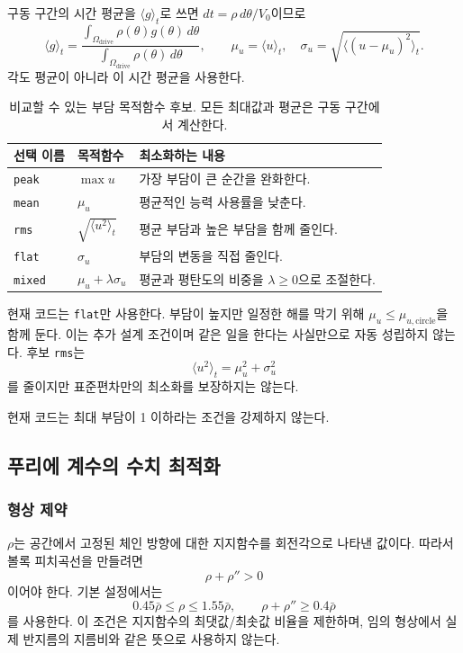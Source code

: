 구동 구간의 시간 평균을 \(\langle g\rangle_t\)로 쓰면 \(dt=\rho\,d\theta/V_0\)이므로
\begin{equation}
\langle g\rangle_t=\frac{\int_{\Omega_{\mathrm{drive}}}\rho(\theta)g(\theta)\,d\theta}
{\int_{\Omega_{\mathrm{drive}}}\rho(\theta)\,d\theta},\qquad
\mu_u=\langle u\rangle_t,\quad \sigma_u=\sqrt{\langle(u-\mu_u)^2\rangle_t}.
\label{eq:me-average}
\end{equation}
각도 평균이 아니라 이 시간 평균을 사용한다.

\begin{table}[!htb]
\centering\small
\begin{tabular}{@{}L{19mm} L{41mm} L{80mm}@{}}
\toprule
선택 이름 & 목적함수 & 최소화하는 내용\\\midrule
\texttt{peak} & \(\max u\) & 가장 부담이 큰 순간을 완화한다.\\
\texttt{mean} & \(\mu_u\) & 평균적인 능력 사용률을 낮춘다.\\
\texttt{rms} & \(\sqrt{\langle u^2\rangle_t}\) & 평균 부담과 높은 부담을 함께 줄인다.\\
\texttt{flat} & \(\sigma_u\) & 부담의 변동을 직접 줄인다.\\
\texttt{mixed} & \(\mu_u+\lambda\sigma_u\) & 평균과 평탄도의 비중을 \(\lambda\geq0\)으로 조절한다.\\
\bottomrule
\end{tabular}
\caption{비교할 수 있는 부담 목적함수 후보. 모든 최대값과 평균은 구동 구간에서 계산한다.}
\label{tab:me-objectives}
\end{table}

현재 코드는 \texttt{flat}만 사용한다. 부담이 높지만 일정한 해를 막기 위해 \(\mu_u\leq\mu_{u,\mathrm{circle}}\)을 함께 둔다. 이는 추가 설계 조건이며 같은 일을 한다는 사실만으로 자동 성립하지 않는다. 후보 \texttt{rms}는
\[
\langle u^2\rangle_t=\mu_u^2+\sigma_u^2
\]
를 줄이지만 표준편차만의 최소화를 보장하지는 않는다.

현재 코드는 최대 부담이 1 이하라는 조건을 강제하지 않는다.

\subsection{푸리에 계수의 수치 최적화}
\subsubsection{형상 제약}
\(\rho\)는 공간에서 고정된 체인 방향에 대한 지지함수를 회전각으로 나타낸 값이다. 따라서 볼록 피치곡선을 만들려면
\begin{equation}
\rho+\rho''>0
\label{eq:13}
\end{equation}
이어야 한다. 기본 설정에서는
\[
0.45\bar\rho\leq\rho\leq1.55\bar\rho,\qquad
\rho+\rho''\geq0.4\bar\rho
\]
를 사용한다. 이 조건은 지지함수의 최댓값/최솟값 비율을 제한하며, 임의 형상에서 실제 반지름의 지름비와 같은 뜻으로 사용하지 않는다.

